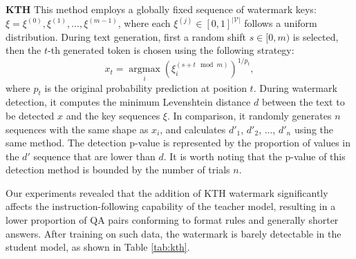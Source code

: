 \textbf{KTH} \cite{kuditipudi2023robust} \quad This method employs a globally fixed sequence of watermark keys: $\xi = \xi^{(0)}, \xi^{(1)}, ...,\xi^{(m-1)}$, where each $\xi^{(j)}\in [0,1]^{|\mathcal{V}|}$ follows a uniform distribution. During text generation, first a random shift $s \in [0,m)$ is selected, then the $t$-th generated token is chosen using the following strategy:
\begin{equation}
    x_t = \mathop{\arg\max}\limits_{i} (\xi_i^{(s+t\mod m)})^{1/p_t},
\end{equation}
where $p_t$ is the original probability prediction at position $t$. During watermark detection, it computes the minimum Levenshtein distance $d$ between the text to be detected $x$ and the key sequences $\xi$. In comparison, it randomly generates $n$ sequences with the same shape as $x_i$, and calculates $d'_1$, $d'_2$, ..., $d'_n$ using the same method. The detection p-value is represented by the proportion of values in the $d'$ sequence that are lower than $d$. It is worth noting that the p-value of this detection method is bounded by the number of trials $n$.



Our experiments revealed that the addition of KTH watermark significantly affects the instruction-following capability of the teacher model, resulting in a lower proportion of QA pairs conforming to format rules and generally shorter answers. After training on such data, the watermark is barely detectable in the student model, as shown in Table \ref{tab:kth}.


